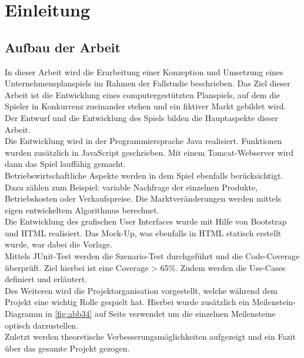 \clearpage
\chapter{Einleitung}
\section{Aufbau der Arbeit}
In dieser Arbeit wird die Erarbeitung einer Konzeption und Umsetzung eines Unternehmensplanspiels im Rahmen der Fallstudie beschrieben. Das Ziel dieser Arbeit ist die Entwicklung eines computergestützten Planspiels, auf dem die Spieler in Konkurrenz zueinander stehen und ein fiktiver Markt gebildet wird. Der Entwurf und die Entwicklung des Spiels bilden die Hauptaspekte dieser Arbeit. \\
Die Entwicklung wird in der Programmiersprache Java realisiert. Funktionen wurden zusätzlich in JavaScript geschrieben. Mit einem Tomcat-Webserver wird dann das Spiel lauffähig gemacht. \\
Betriebswirtschaftliche Aspekte werden in dem Spiel ebenfalls berücksichtigt. Dazu zählen zum Beispiel: variable Nachfrage der einzelnen Produkte, Betriebskosten oder Verkaufspreise. Die Marktveränderungen werden mittels eigen entwickeltem Algorithmus berechnet. \\
Die Entwicklung des grafischen User Interfaces wurde mit Hilfe von Bootstrap und HTML realisiert. Das Mock-Up, was ebenfalls in HTML statisch erstellt wurde, war dabei die Vorlage. \\ 
Mittels JUnit-Test werden die Szenario-Test durchgeführt und die Code-Coverage überprüft. Ziel hierbei ist eine Coverage > 65\%. Zudem werden die Use-Cases definiert und erläutert. \\
Des Weiteren wird die Projektorganisation vorgestellt, welche während dem Projekt eine wichtig Rolle gespielt hat. Hierbei wurde zusätzlich ein Meilenstein-Diagramm in \ref{fig:abb34} auf Seite \pageref{sec:meilenstein} verwendet um die einzelnen Meilensteine optisch darzustellen.\\
Zuletzt werden theoretische Verbesserungsmöglichkeiten aufgezeigt und ein Fazit über das gesamte Projekt gezogen.

\clearpage
